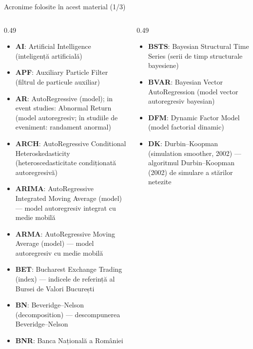 {
\begin{frame}[noframenumbering]
    \titlepage
\end{frame}
}
\begin{frame}{Acronime folosite în acest material (1/3)}
\begin{columns}[T]
\begin{column}{0.49\textwidth}
\begin{itemize}\setlength{\itemsep}{0pt}
    \item \textbf{AI}: Artificial Intelligence (inteligență artificială)
    \item \textbf{APF}: Auxiliary Particle Filter (filtrul de particule auxiliar)
    \item \textbf{AR}: AutoRegressive (model); in event studies: Abnormal Return (model autoregresiv; în studiile de eveniment: randament anormal)
    \item \textbf{ARCH}: AutoRegressive Conditional Heteroskedasticity (heteroscedasticitate condiționată autoregresivă)
    \item \textbf{ARIMA}: AutoRegressive Integrated Moving Average (model) — model autoregresiv integrat cu medie mobilă
    \item \textbf{ARMA}: AutoRegressive Moving Average (model) — model autoregresiv cu medie mobilă
    \item \textbf{BET}: Bucharest Exchange Trading (index) — indicele de referință al Bursei de Valori București
    \item \textbf{BN}: Beveridge–Nelson (decomposition) — descompunerea Beveridge–Nelson
    \item \textbf{BNR}: Banca Națională a României
\end{itemize}
\end{column}
\begin{column}{0.49\textwidth}
\begin{itemize}\setlength{\itemsep}{0pt}
    \item \textbf{BSTS}: Bayesian Structural Time Series (serii de timp structurale bayesiene)
    \item \textbf{BVAR}: Bayesian Vector AutoRegression (model vector autoregresiv bayesian)
    \item \textbf{DFM}: Dynamic Factor Model (model factorial dinamic)
    \item \textbf{DK}: Durbin–Koopman (simulation smoother, 2002) — algoritmul Durbin–Koopman (2002) de simulare a stărilor netezite

\end{itemize}
\end{column}
\end{columns}
\end{frame}
